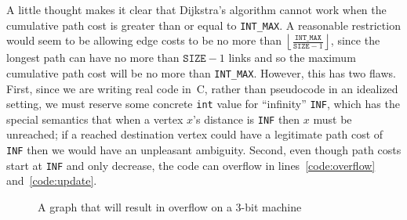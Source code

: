 A little thought makes it clear that Dijkstra's algorithm cannot work when the cumulative path
cost is greater than or equal to \texttt{INT\_MAX}.  A reasonable restriction would seem to be
allowing edge costs to be no more than $\left\lfloor\frac{\texttt{INT\_MAX}}{\texttt{SIZE}-1}\right\rfloor$, since the longest path can have no more than $\texttt{SIZE}-1$ links and so the maximum cumulative path cost will be no more than \texttt{INT\_MAX}.  However, this has two flaws.  First, since we are writing real code in~C, rather than pseudocode in an idealized setting, we must reserve some concrete \texttt{int} value for ``infinity'' \texttt{INF}, which has the special semantics that when a vertex $x$'s distance is \texttt{INF} then $x$ must be unreached; if a reached destination vertex could have a legitimate path cost of \texttt{INF} then we would have an unpleasant ambiguity.  Second, even though path costs start at \texttt{INF} and only decrease, the code can overflow in lines~\ref{code:overflow} and~\ref{code:update}.

\begin{figure}[t]
\centering
{}
\caption{A graph that will result in overflow on a 3-bit machine}
\label{fig:overflow}
\end{figure}

